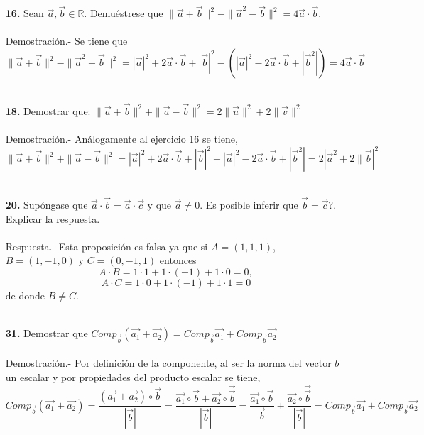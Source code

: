 \begin{enumerate}

\item [\Large\bfseries 16.] Sean $\vec{a},\vec{b}\in \mathbb{R}$. Demuéstrese que $\|\vec{a}+\vec{b}\|^2-\|\vec{a}^2-\vec{b}\|^2=4\vec{a}\cdot \vec{b}$.\\\\
    Demostración.-\; Se tiene que $$\|\vec{a}+\vec{b}\|^2-\|\vec{a}^2-\vec{b}\|^2=|\vec{a}|^2 + 2\vec{a}\cdot \vec{b} + | \vec{b} |^2 - \left(|\vec{a}|^2 - 2\vec{a} \cdot \vec{b} + |\vec{b}^2|\right)=4\vec{a} \cdot \vec{b}$$\\


\item [\Large\bfseries 18.] Demostrar que: $\|\vec{a}+\vec{b}\|^2 + \|\vec{a}-\vec{b}\|^2 = 2\|\vec{u}\|^2+2\|\vec{v}\|^2$\\\\
    Demostración.-\; Análogamente al ejercicio 16 se tiene, 
    $$\|\vec{a}+\vec{b}\|^2 + \|\vec{a}-\vec{b}\|^2 = |\vec{a}|^2 + 2\vec{a}\cdot \vec{b} + |\vec{b}|^2 + |\vec{a}|^2 - 2\vec{a} \cdot \vec{b} + |\vec{b}^2| = 2|\vec{a}^2 + 2\|\vec{b}|^2$$\\


\item [\Large\bfseries 20.] Supóngase que $\vec{a}\cdot \vec{b} = \vec{a}\cdot \vec{c}$ y que $\vec{a}\neq 0$. Es posible inferir que $\vec{b}=\vec{c}$?. Explicar la respuesta.\\\\
    Respuesta.-\; Esta proposición es falsa ya que si $A=(1,1,1)$, $B=(1,-1,0)$ y $C=(0,-1,1)$ entonces $$A\cdot B = 1\cdot 1 + 1\cdot(-1)+1\cdot 0 = 0,$$ $$A\cdot C = 1\cdot 0 + 1\cdot(-1)+1\cdot 1 = 0$$
    de donde $B\neq C$.\\\\ 

\item [\Large\bfseries 31.] Demostrar que $Comp_{\vec{b}}\left(\vec{a_1}+\vec{a_2}\right) = Comp_{\vec{b}}\vec{a_1} + Comp_{\vec{b}}\vec{a_2}$\\\\
    Demostración.-\; Por definición de la componente, al ser la norma del vector $b$ un escalar y por propiedades del producto escalar se tiene, 
    $$Comp_{\vec{b}}\left(\vec{a_1}+\vec{a_2}\right) = \dfrac{\left(\vec{a_1}+\vec{a_2}\right)\circ \vec{b}}{|\vec{b}|}=\dfrac{\vec{a_1}\circ \vec{b} + \vec{a_2} \circ \vec{\vec{b}}}{|\vec{b}|} = \dfrac{\vec{a_1}\circ \vec{b}}{\vec{b}} + \dfrac{\vec{a_2} \circ \vec{\vec{b}}}{|\vec{b}|} =  Comp_{\vec{b}}\vec{a_1} + Comp_{\vec{b}}\vec{a_2}$$\\


\end{enumerate}
